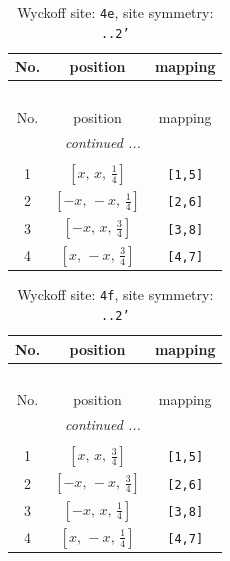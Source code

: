 \documentclass[fleqn,8pt]{jsarticle}
\begin{document}
\begin{longtable}{ccc}
\caption{Wyckoff site: {\tt 4e}, site symmetry: {\tt ..2'}}
 \\
 \hline \hline
No. & position & mapping \\ \hline \endfirsthead

\multicolumn{2}{l}{\tablename\ \thetable{}} \\
 \hline \hline
No. & position & mapping \\ \hline \endhead

 \hline \hline
\multicolumn{2}{r}{\footnotesize\it continued ...} \\ \endfoot

 \hline \hline
\multicolumn{2}{r}{} \\ \endlastfoot

1 & $\left[ x,\, x,\, \frac{1}{4} \right]$ & {\tt [1,5]} \\ \hline
2 & $\left[ - x,\, - x,\, \frac{1}{4} \right]$ & {\tt [2,6]} \\ \hline
3 & $\left[ - x,\, x,\, \frac{3}{4} \right]$ & {\tt [3,8]} \\ \hline
4 & $\left[ x,\, - x,\, \frac{3}{4} \right]$ & {\tt [4,7]} \\
\end{longtable}
\renewcommand{\arraystretch}{1.2}
\begin{longtable}{ccc}
\caption{Wyckoff site: {\tt 4f}, site symmetry: {\tt ..2'}}
 \\
 \hline \hline
No. & position & mapping \\ \hline \endfirsthead

\multicolumn{2}{l}{\tablename\ \thetable{}} \\
 \hline \hline
No. & position & mapping \\ \hline \endhead

 \hline \hline
\multicolumn{2}{r}{\footnotesize\it continued ...} \\ \endfoot

 \hline \hline
\multicolumn{2}{r}{} \\ \endlastfoot

1 & $\left[ x,\, x,\, \frac{3}{4} \right]$ & {\tt [1,5]} \\ \hline
2 & $\left[ - x,\, - x,\, \frac{3}{4} \right]$ & {\tt [2,6]} \\ \hline
3 & $\left[ - x,\, x,\, \frac{1}{4} \right]$ & {\tt [3,8]} \\ \hline
4 & $\left[ x,\, - x,\, \frac{1}{4} \right]$ & {\tt [4,7]} \\
\end{longtable}
\end{document}
